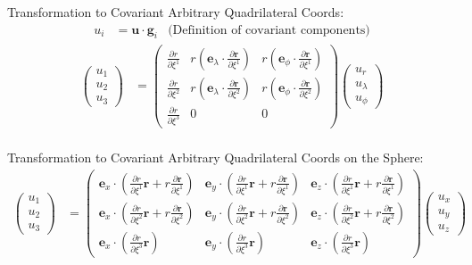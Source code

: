 \documentclass{report}
\newcommand{\vb}{\mathbf}
\newcommand{\pdiff}[2]{\frac{\partial #1}{\partial #2}}
\begin{document}
Transformation to Covariant Arbitrary Quadrilateral Coords:
\begin{align}
u_i &= \vb{u} \cdot \vb{g}_i & \mbox{(Definition of covariant components)}
\end{align}
\begin{align}
\left( \begin{array}{c} u_1 \\ u_2 \\ u_3 \end{array} \right) 
&= \left( \begin{array}{ccc} \pdiff{r}{\xi^1} & r \left( \vb{e}_\lambda \cdot \pdiff{\vb{r}}{\xi^1} \right) & r \left( \vb{e}_\phi \cdot \pdiff{\vb{r}}{\xi^1} \right)  \\
[2.0ex]  \pdiff{r}{\xi^2} & r \left( \vb{e}_\lambda \cdot \pdiff{\vb{r}}{\xi^2} \right) & r \left( \vb{e}_\phi \cdot \pdiff{\vb{r}}{\xi^2} \right) \\
[2.0ex] \pdiff{r}{\xi^3}  & 0 & 0 \end{array} \right) \left( \begin{array}{c} u_r \\ u_\lambda \\ u_\phi   \end{array} \right) \\
\end{align}

Transformation to Covariant Arbitrary Quadrilateral Coords on the Sphere:
\begin{align}
\label{eq:cov-cartesian-sphere}
\left( \begin{array}{c} u_1 \\ u_2 \\ u_3 \end{array} \right) 
&= \left( \begin{array}{ccc} \vb{e}_x\cdot\left(\pdiff{r}{\xi^1}\vb{r} + r \pdiff{\vb{r}}{\xi^1}\right) & \vb{e}_y\cdot\left(\pdiff{r}{\xi^1}\vb{r} + r \pdiff{\vb{r}}{\xi^1}\right) & \vb{e}_z\cdot\left(\pdiff{r}{\xi^1}\vb{r} + r \pdiff{\vb{r}}{\xi^1}\right)  \\
[2.0ex]  \vb{e}_x\cdot\left(\pdiff{r}{\xi^2}\vb{r} + r \pdiff{\vb{r}}{\xi^2}\right) & \vb{e}_y\cdot\left(\pdiff{r}{\xi^2}\vb{r} + r \pdiff{\vb{r}}{\xi^2}\right) & \vb{e}_z\cdot\left(\pdiff{r}{\xi^2}\vb{r} + r \pdiff{\vb{r}}{\xi^2}\right) \\
[2.0ex] \vb{e}_x\cdot\left(\pdiff{r}{\xi^3}\vb{r} \right) & \vb{e}_y\cdot\left(\pdiff{r}{\xi^3}\vb{r} \right) & \vb{e}_z\cdot\left(\pdiff{r}{\xi^3}\vb{r} \right) 
\end{array}\right) \left( \begin{array}{c} u_x \\ u_y \\ u_z   \end{array} \right)
\end{align}
\end{document}
